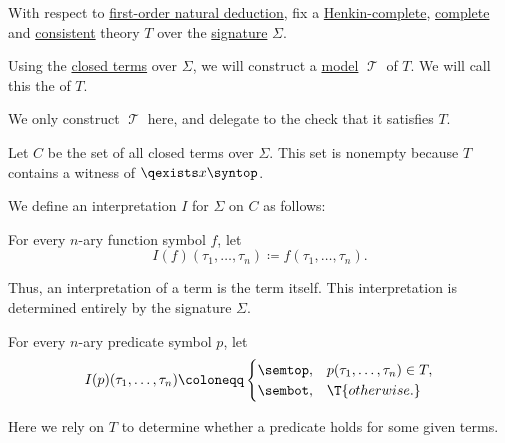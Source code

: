 \begin{definition}\label{def:fol_term_model}
  With respect to \hyperref[def:fol_natural_deduction_system]{first-order natural deduction}, fix a \hyperref[def:fol_henkin_completeness]{Henkin-complete}, \hyperref[def:fol_theory/complete]{complete} and \hyperref[def:fol_theory/consistent]{consistent} theory \( T \) over the \hyperref[def:fol_signature]{signature} \( \Sigma \).

  Using the \hyperref[def:fol_closed_term]{closed terms} over \( \Sigma \), we will construct a \hyperref[def:fol_semantics/model]{model} \( \mscrT \) of \( T \). We will call this the  of \( T \).

  We only construct \( \mscrT \) here, and delegate to  the check that it satisfies \( T \).

  \begin{thmenum}
     Let \( C \) be the set of all closed terms over \( \Sigma \). This set is nonempty because \( T \) contains a witness of \( \qexists x \syntop \).

    We define an interpretation \( I \) for \( \Sigma \) on \( C \) as follows:
    \begin{thmenum}
       For every \( n \)-ary function symbol \( f \), let
      \begin{equation*}
        I(f)(\tau_1, \ldots, \tau_n) \coloneqq f(\tau_1, \ldots, \tau_n).
      \end{equation*}

      Thus, an interpretation of a term is the term itself. This interpretation is determined entirely by the signature \( \Sigma \).

       For every \( n \)-ary predicate symbol \( p \), let
      \begin{equation*}
        I(p)(\tau_1, \ldots, \tau_n) \coloneqq \begin{cases}
          \semtop, &p(\tau_1, \ldots, \tau_n) \in T, \\
          \sembot, &\T{otherwise.}
        \end{cases}
      \end{equation*}

      Here we rely on \( T \) to determine whether a predicate holds for some given terms.
    \end{thmenum}


\end{thmenum}
\end{definition}
